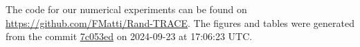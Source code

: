 The code for our numerical experiments can be found on \url{https://github.com/FMatti/Rand-TRACE}. The figures and tables were generated from the commit \href{https://github.com/FMatti/Rand-TRACE/tree/7c053ed}{7c053ed} on 2024-09-23 at 17:06:23 UTC.
